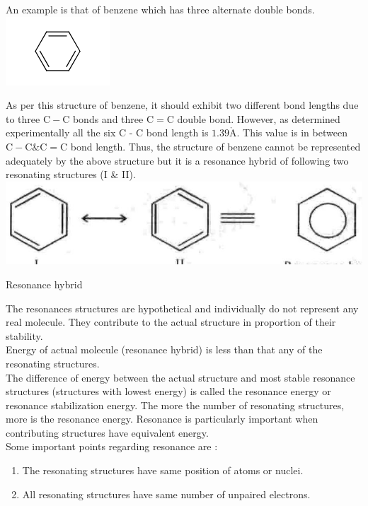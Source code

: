 \documentclass[10pt]{article}
\def\AA{\mathring{\mathrm{A}}}
\begin{document}
An example is that of benzene which has three alternate double bonds.\\
\includegraphics{smile-5337aa87fc0acee3a2895fd27a02280bcd9fb5e9}

As per this structure of benzene, it should exhibit two different bond lengths due to three $\mathrm{C}-\mathrm{C}$ bonds and three $\mathrm{C}=\mathrm{C}$ double bond. However, as determined experimentally all the six C - C bond length is $1.39 \AA$. This value is in between $\mathrm{C}-\mathrm{C} \& \mathrm{C}=\mathrm{C}$ bond length. Thus, the structure of benzene cannot be represented adequately by the above structure but it is a resonance hybrid of following two resonating structures (I \& II).\\
\includegraphics[max width=\textwidth, center]{2025_01_28_8470952b98110cec3aabg-069(1)}

Resonance hybrid

The resonances structures are hypothetical and individually do not represent any real molecule. They contribute to the actual structure in proportion of their stability.\\
Energy of actual molecule (resonance hybrid) is less than that any of the resonating structures.\\
The difference of energy between the actual structure and most stable resonance structures (structures with lowest energy) is called the resonance energy or resonance stabilization energy. The more the number of resonating structures, more is the resonance energy. Resonance is particularly important when contributing structures have equivalent energy.\\
Some important points regarding resonance are :

\begin{enumerate}
  \item The resonating structures have same position of atoms or nuclei.
  \item All resonating structures have same number of unpaired electrons.
\end{enumerate}
\end{document}
